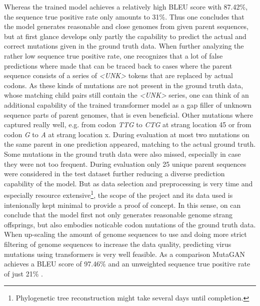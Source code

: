 Whereas the trained model achieves a relatively high \ac{BLEU} score with 87.42\%, the sequence true positive rate only amounts to 31\%. Thus one concludes that the model generates reasonable and close genomes from given parent sequences, but at first glance develops only partly the capability to predict the actual and correct mutations given in the ground truth data. When further analyzing the rather low sequence true positive rate, one recognizes that a lot of false predictions where made that can be traced back to cases where the parent sequence consists of a series of \textit{<UNK>} tokens that are replaced by actual codons. As these kinds of mutations are not present in the ground truth data, whose matching child pairs still contain the \textit{<UNK>} series, one can think of an additional capability of the trained transformer model as a gap filler of unknown sequence parts of parent genomes, that is even beneficial. Other mutations where captured really well, e.g. from codon \textit{TTG} to \textit{CTG} at strang location 45 or from codon \textit{G} to \textit{A} at strang location x. During evaluation at most two mutations on the same parent in one prediction appeared, matching to the actual ground truth. Some mutations in the ground truth data were also missed, especially in case they were not too frequent. During evaluation only 25 unique parent sequences were considered in the test dataset further reducing a diverse prediction capability of the model. But as data selection and preprocessing is very time and especially resource extensive\footnote{Phylogenetic tree reconstruction might take several days until completion.}, the scope of the project and its data used is intenionally kept minimal to provide a proof of concept. In this sense, on can conclude that the model first not only generates reasonable genome strang offsprings, but also embodies noticable codon mutations of the ground truth data. When up-scaling the amount of genome sequences to use and doing more strict filtering of genome sequences to increase the data quality, predicting virus mutations using transformers is very well feasible. As a comparison MutaGAN achieves a \ac{BLEU} score of 97.46\% and an unweighted sequence true positive rate of just 21\% \cite{Berman2020}. 
 
\newpage
